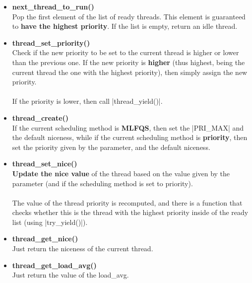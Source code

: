 \documentclass{article}
\begin{document}
\begin{itemize}
	\item \textbf{next\_thread\_to\_run()}
	\vspace{.2cm} \\
	Pop the first element of the list of ready threads. This element is guaranteed to \textbf{have the highest priority}. If the list is empty, return an idle thread.
	
	\item \textbf{thread\_set\_priority()}
	\vspace{.2cm} \\
	Check if the new priority to be set to the current thread is higher or lower than the previous one. If the new priority is \textbf{higher} (thus highest, being the current thread the one with the highest priority), then simply assign the new priority. \\ \\
	If the priority is lower, then call \cverb|thread_yield()|.
	
	\item \textbf{thread\_create()}
	\vspace{.2cm} \\
	If the current scheduling method is \textbf{MLFQS}, then set the \cverb|PRI_MAX| and the default niceness, while if the current scheduling method is \textbf{priority}, then set the priority given by the parameter, and the default niceness.
	
	\item \textbf{thread\_set\_nice()}
	\vspace{.2cm} \\
	\textbf{Update the nice value} of the thread based on the value given by the parameter (and if the scheduling method is set to priority). \\ \\
	The value of the thread priority is recomputed, and there is a function that checks whether this is the thread with the highest priority inside of the ready list (using \cverb|try_yield()|).
	
	\item \textbf{thread\_get\_nice()}
	\vspace{.2cm} \\
	Just return the niceness of the current thread.
	
	\item \textbf{thread\_get\_load\_avg()}
	\vspace{.2cm} \\
	Just return the value of the load\_avg.
	

\end{itemize}
\end{document}
